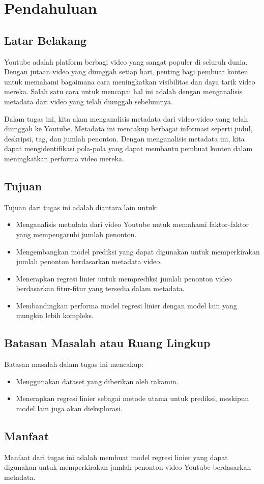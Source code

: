 \section{Pendahuluan}

\subsection{Latar Belakang}

Youtube adalah platform berbagi video yang sangat populer di seluruh dunia. Dengan jutaan video yang diunggah setiap hari, penting bagi pembuat konten untuk memahami bagaimana cara meningkatkan visibilitas dan daya tarik video mereka. Salah satu cara untuk mencapai hal ini adalah dengan menganalisis metadata dari video yang telah diunggah sebelumnya.

Dalam tugas ini, kita akan menganalisis metadata dari video-video yang telah diunggah ke Youtube. Metadata ini mencakup berbagai informasi seperti judul, deskripsi, tag, dan jumlah penonton. Dengan menganalisis metadata ini, kita dapat mengidentifikasi pola-pola yang dapat membantu pembuat konten dalam meningkatkan performa video mereka.

\subsection{Tujuan}
Tujuan dari tugas ini adalah diantara lain untuk:

\begin{itemize}
    \item Menganalisis metadata dari video Youtube untuk memahami faktor-faktor yang mempengaruhi jumlah penonton.
    \item Mengembangkan model prediksi yang dapat digunakan untuk memperkirakan jumlah penonton berdasarkan metadata video.
    \item Menerapkan regresi linier untuk memprediksi jumlah penonton video berdasarkan fitur-fitur yang tersedia dalam metadata.
    \item Membandingkan performa model regresi linier dengan model lain yang mungkin lebih kompleks.
\end{itemize}

\subsection{Batasan Masalah atau Ruang Lingkup}
Batasan masalah dalam tugas ini mencakup:
\begin{itemize}
    \item Menggunakan dataset yang diberikan oleh rakamin.
    \item Menerapkan regresi linier sebagai metode utama untuk prediksi, meskipun model lain juga akan dieksplorasi.
\end{itemize}

\subsection{Manfaat}
Manfaat dari tugas ini adalah membuat model regresi linier yang dapat digunakan untuk memperkirakan jumlah penonton video Youtube berdasarkan metadata.


